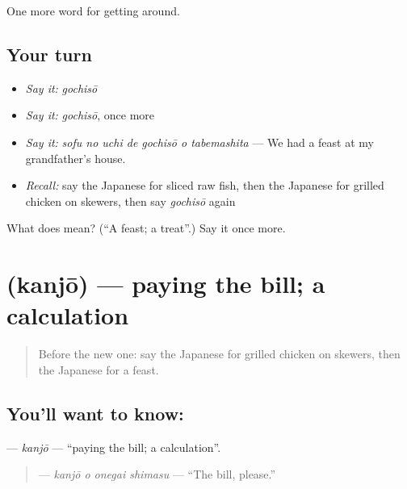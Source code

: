 \begin{grammarlens}[title={What you've built}]
One more word for getting around.
\end{grammarlens}

\subsection*{Your turn}
\begin{itemize}
\raggedright
  \item \emph{Say it:} \emph{gochisō}
  \item \emph{Say it:} \emph{gochisō}, once more
  \item \emph{Say it:} \emph{sofu no uchi de gochisō o tabemashita} — We had a feast at my grandfather's house.
  \item \emph{Recall:} say the Japanese for sliced raw fish, then the Japanese for grilled chicken on skewers, then say \emph{gochisō} again
\end{itemize}

\begin{tcolorbox}[breakable,colback=teal!4,colframe=teal!35!black,title={Before you move on}]
What does  mean? (\textquotedblleft{}A feast; a treat\textquotedblright{}.) Say it once more.
\end{tcolorbox}
\section[\texorpdfstring{\ja{かんじょう} (kanjō)}{かんじょう (kanjō)}]{ (kanjō) — paying the bill; a calculation}

\label{lesson:JA-C423-kanjou}



\begin{quote}
Before the new one: say the Japanese for grilled chicken on skewers, then the Japanese for a feast.
\end{quote}

\subsection*{You'll want to know: }
\textbf{} — \emph{kanjō} — \textquotedblleft{}paying the bill; a calculation\textquotedblright{}.

\begin{quote}
\textbf{ } — \emph{kanjō o onegai shimasu} — \textquotedblleft{}The bill, please.\textquotedblright{}
\end{quote}

